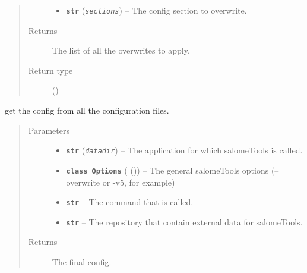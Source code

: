 \documentclass[a4paper,10pt,english]{sphinxmanual}
\begin{document}
\begin{fulllineitems}
\begin{fulllineitems}
\begin{quote}
\begin{description}
\begin{itemize}
\item {} 
\textbf{\texttt{str}} (\emph{\texttt{sections}}) -- The config section to overwrite.

\end{itemize}

\item[{Returns}] \leavevmode
The list of all the overwrites to apply.

\item[{Return type}] \leavevmode
{\hyperref[commands/apidoc/src:src.utilsSat.Path.list]{}} ()

\end{description}\end{quote}

\end{fulllineitems}


\begin{fulllineitems}
\label{commands/apidoc/src:src.configManager.ConfigManager.get_config}
get the config from all the configuration files.
\begin{quote}\begin{description}
\item[{Parameters}] \leavevmode\begin{itemize}
\item {} 
\textbf{\texttt{str}} (\emph{\texttt{datadir}}) -- The application for which salomeTools is called.

\item {} 
\textbf{\texttt{class Options}} ({\hyperref[commands/apidoc/src:module\string-src.options]{}} ()) -- The general salomeTools options (--overwrite or -v5, for example)

\item {} 
\textbf{\texttt{str}} -- The command that is called.

\item {} 
\textbf{\texttt{str}} -- The repository that contain external data for salomeTools.

\end{itemize}

\item[{Returns}] \leavevmode
The final config.


\end{description}
\end{quote}
\end{fulllineitems}
\end{fulllineitems}
\end{document}
